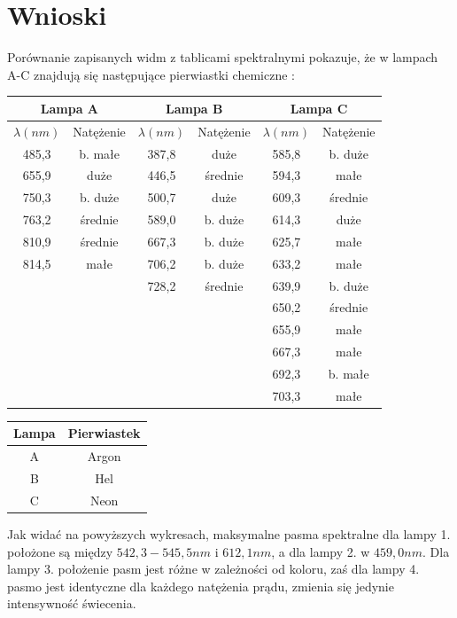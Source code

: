 \documentclass[10pt,a4paper]{article}
\newcommand{\forceindent}{\leavevmode{\parindent=3em\indent}}
\begin{document}
\section*{Wnioski}
\forceindent Porównanie zapisanych widm z tablicami spektralnymi pokazuje, że w lampach A-C znajdują się następujące pierwiastki chemiczne :
\begin{center}
\begin{tabular}{|c|c|c|c|c|c|}
\multicolumn{2}{c}{Lampa A} & \multicolumn{2}{c}{Lampa B} & \multicolumn{2}{c}{Lampa C}\\
\hline
$\lambda (nm)$ & Natężenie & $\lambda (nm)$ & Natężenie & $\lambda (nm)$ & Natężenie\\
\hline
485,3 & b. małe & 387,8 & duże & 585,8 & b. duże\\
\hline
655,9 & duże & 446,5 & średnie & 594,3 & małe \\
\hline
750,3 & b. duże & 500,7 & duże & 609,3 & średnie \\
\hline
763,2 & średnie & 589,0 & b. duże & 614,3 & duże \\
\hline
810,9 & średnie & 667,3 & b. duże & 625,7 & małe \\
\hline
814,5 & małe & 706,2 & b. duże & 633,2 & małe \\
\hline
&& 728,2 & średnie & 639,9 & b. duże \\
\hline
&&&& 650,2 & średnie \\
\hline
&&&& 655,9 & małe \\
\hline
&&&& 667,3 & małe \\
\hline
&&&& 692,3 & b. małe \\
\hline
&&&& 703,3 & małe \\
\hline

\end{tabular}
\end{center}
\begin{center}
\begin{tabular}{|c|c|}
\hline
\textbf{Lampa} & \textbf{Pierwiastek} \\
\hline
A & Argon \\
\hline
B & Hel \\
\hline
C & Neon \\
\hline
\end{tabular}
\end{center}

\forceindent Jak widać na powyższych wykresach, maksymalne pasma spektralne dla lampy 1. położone są między $ 542,3 - 545,5 nm$ i $612,1 nm$, a dla lampy 2. w $459,0 nm$. Dla lampy 3. położenie pasm jest różne w zależności od koloru, zaś dla lampy 4. pasmo jest identyczne dla każdego natężenia prądu, zmienia się jedynie intensywność świecenia.\\
\end{document}
